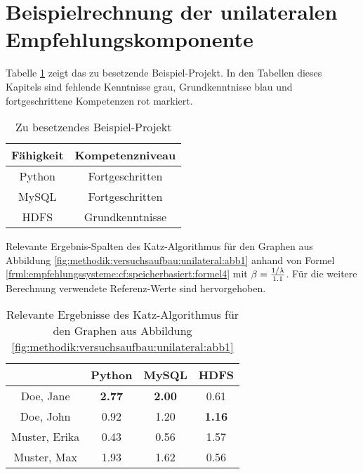 \section{Beispielrechnung der unilateralen Empfehlungskomponente}
\label{ch:nebenrechnungen:bilateral}
Tabelle \ref{tbl:nebenrechnungen:bilateral:tbl1} zeigt das zu besetzende Beispiel-Projekt. In den Tabellen dieses Kapitels sind fehlende Kenntnisse grau, Grundkenntnisse blau und fortgeschrittene Kompetenzen rot markiert.
\begin{table}[h]
	\centering
	\begin{tabular}{c|c}
		Fähigkeit & Kompetenzniveau \\
		\hline
		Python  & \cellcolor{usercolor}Fortgeschritten\\
		MySQL   & \cellcolor{usercolor}Fortgeschritten\\
		HDFS    & \cellcolor{itemcolor}Grundkenntnisse
	\end{tabular}
	\caption{Zu besetzendes Beispiel-Projekt}
	\label{tbl:nebenrechnungen:bilateral:tbl1}
\end{table}

Relevante Ergebnis-Spalten des Katz-Algorithmus für den Graphen aus Abbildung \ref{fig:methodik:versuchsaufbau:unilateral:abb1} anhand von Formel \ref{frml:empfehlungssysteme:cf:speicherbasiert:formel4} mit $\beta = \frac{1/\lambda}{1.1}$. Für die weitere Berechnung verwendete Referenz-Werte sind hervorgehoben.

\begin{table}[h]
	\centering
	\begin{tabular}{c|c|c|c}
		& Python & MySQL & HDFS\\ 
		\hline
		Doe, Jane     & \cellcolor{usercolor}\textbf{2.77} & \cellcolor{itemcolor}\textbf{2.00} & \cellcolor{exxetagray}0.61\\
		Doe, John     & \cellcolor{exxetagray}0.92 & \cellcolor{itemcolor}1.20 & \cellcolor{itemcolor}\textbf{1.16}\\
		Muster, Erika & \cellcolor{exxetagray}0.43 & \cellcolor{exxetagray}0.56 & \cellcolor{usercolor}1.57\\
		Muster, Max   & \cellcolor{itemcolor}1.93 & \cellcolor{itemcolor}1.62 & \cellcolor{exxetagray}0.56
	\end{tabular}
	\caption{Relevante Ergebnisse des Katz-Algorithmus für den Graphen aus Abbildung \ref{fig:methodik:versuchsaufbau:unilateral:abb1}}
	\label{tbl:nebenrechnungen:bilateral:tbl2}
\end{table}

